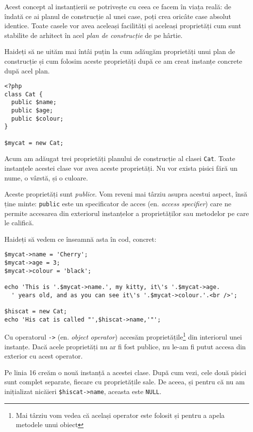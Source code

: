 Acest concept al instanțierii se potrivește cu ceea ce facem în viața reală:
de îndată ce ai planul de construcție al unei case, poți crea oricâte case
absolut identice. Toate casele vor avea aceleași facilități și aceleași
proprietăți cum sunt stabilite de arhitect în acel \textit{plan de construcție}
de pe hârtie.

Haideți să ne uităm mai întâi puțin la cum adăugăm proprietăți unui plan de construcție
și cum folosim aceste proprietăți după ce am creat instanțe concrete după acel plan.

\begin{lstlisting}[title=Public Class Properties]
<?php
class Cat {
  public $name;
  public $age;
  public $colour;
}

$mycat = new Cat;
\end{lstlisting}

Acum am adăugat trei proprietăți planului de construcție al clasei \texttt{Cat}. Toate
instanțele acestei clase vor avea aceste proprietăți. Nu vor exista pisici fără un
nume, o vârstă, și o culoare.

Aceste proprietăți sunt \textsl{publice}. Vom reveni mai târziu asupra acestui aspect,
însă ține minte: \texttt{public} este un specificator de acces (en. \textsl{access specifier})
care ne permite accesarea din exteriorul instanțelor a proprietăților sau metodelor pe 
care le califică.

Haideți să vedem ce înseamnă asta în cod, concret:
\begin{lstlisting}[firstnumber=9,title={Public Class Properties}]
$mycat->name = 'Cherry';
$mycat->age = 3;
$mycat->colour = 'black';

echo 'This is '.$mycat->name.', my kitty, it\'s '.$mycat->age.
  ' years old, and as you can see it\'s '.$mycat->colour.'.<br />';

$hiscat = new Cat;
echo 'His cat is called "',$hiscat->name,'"';
\end{lstlisting}

Cu operatorul \texttt{->} (en. \textsl{object operator}) accesăm
proprietățile\footnote{Mai târziu vom vedea că același operator este
folosit și pentru a apela metodele unui obiect} din interiorul unei instanțe.
Dacă acele proprietăți nu ar fi fost publice, nu le-am fi putut accesa din exterior
cu acest operator.

Pe linia 16 creăm o nouă instanță a acestei clase. După cum vezi, cele două pisici sunt complet
separate, fiecare cu proprietățile sale. De aceea, și pentru
că nu am inițializat nicăieri \texttt{\$hiscat->name}, aceasta este \texttt{NULL}.

